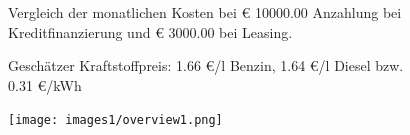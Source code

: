 \documentclass[landscape, DIV=99, 14pt]{scrartcl}
\begin{document}
\pagebreak



\pagebreak

\onecolumn
\begin{figure}
\centering
Vergleich der monatlichen Kosten bei \euro{} 10000.00 Anzahlung bei Kreditfinanzierung und \euro{} 3000.00 bei Leasing.

Gesch\"atzer Kraftstoffpreis: 1.66 \euro{}/l Benzin, 1.64 \euro{}/l Diesel bzw. 0.31 \euro{}/kWh


\vspace{1em}
\texttt{[image: images1/overview1.png]}
\end{figure}
\vfill 
\end{document}
